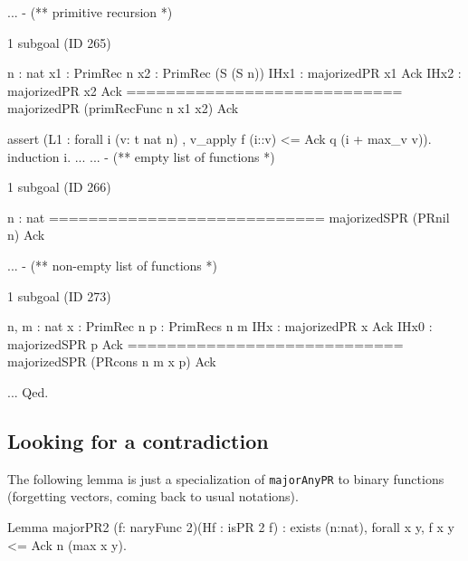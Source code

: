 \begin{Coqsrc}
  ...
 - (** primitive recursion *)
\end{Coqsrc}

\begin{Coqanswer}
1 subgoal (ID 265)
  
  n : nat
  x1 : PrimRec n
  x2 : PrimRec (S (S n))
  IHx1 : majorizedPR x1 Ack
  IHx2 : majorizedPR x2 Ack
  ============================
  majorizedPR (primRecFunc n x1 x2) Ack
\end{Coqanswer}

\begin{Coqsrc}
 assert (L1 : forall i (v: t nat n) ,
               v_apply f (i::v)  <= Ack q (i + max_v v)).
    { induction i.
      ...
    }
    ...
-  (** empty list of functions *)
\end{Coqsrc}

\begin{Coqanswer}
1 subgoal (ID 266)
  
  n : nat
  ============================
  majorizedSPR (PRnil n) Ack
\end{Coqanswer}

\begin{Coqsrc}
  ...
- (** non-empty list of functions *)
\end{Coqsrc}

\begin{Coqanswer}
1 subgoal (ID 273)
  
  n, m : nat
  x : PrimRec n
  p : PrimRecs n m
  IHx : majorizedPR x Ack
  IHx0 : majorizedSPR p Ack
  ============================
  majorizedSPR (PRcons n m x p) Ack
\end{Coqanswer}
  
\begin{Coqsrc}
 ...
Qed.
\end{Coqsrc}

\subsection{Looking for a contradiction}

The following lemma is just a specialization of \texttt{majorAnyPR} to
binary functions (forgetting vectors, coming back to usual notations).

\begin{Coqsrc}
Lemma majorPR2 (f: naryFunc 2)(Hf : isPR 2 f)
  : exists (n:nat), forall x y,  f x y <= Ack n (max x  y).
\end{Coqsrc}

